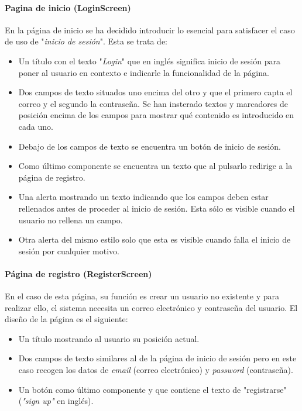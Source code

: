 \documentclass[twoside, openright, 11pt]{report}
\begin{document}
		\paragraph{Pagina de inicio (LoginScreen)} 
		\label{LoginScreenEstadoDelArte}
		En la página de inicio se ha decidido introducir lo esencial para satisfacer el caso de uso de "\textit{inicio de sesión}". Esta se trata de:
		
		\begin{itemize}
			\item Un título con el texto "\textit{Login}" que en inglés significa inicio de sesión para poner al usuario en contexto e indicarle la funcionalidad de la página.
			\item Dos campos de texto situados uno encima del otro y que el primero capta el correo y el segundo la contraseña. Se han insterado textos y marcadores de posición encima de los campos para mostrar qué contenido es introducido en cada uno.
			\item Debajo de los campos de texto se encuentra un botón de inicio de sesión.
			\item Como último componente se encuentra un texto que al pulsarlo redirige a la página de registro.
			\item Una alerta mostrando un texto indicando que los campos deben estar rellenados antes de proceder al inicio de sesión. Esta sólo es visible cuando el usuario no rellena un campo.
			\item Otra alerta del mismo estilo solo que esta es visible cuando falla el inicio de sesión por cualquier motivo.
		\end{itemize}
		
		\paragraph{Página de registro (RegisterScreen)}
		En el caso de esta página, su función es crear un usuario no existente y para realizar ello, el sistema necesita un correo electrónico y contraseña del usuario.
		El diseño de la página es el siguiente:
		
		\begin{itemize}
			\item Un título mostrando al usuario su posición actual.
			\item Dos campos de texto similares al de la página de inicio de sesión pero en este caso recogen los datos de \textit{email} (correo electrónico) y \textit{password} (contraseña).
			\item Un botón como último componente y que contiene el texto de "registrarse" (\textit{"sign up"} en inglés).
		\end{itemize}
	
\end{document}
